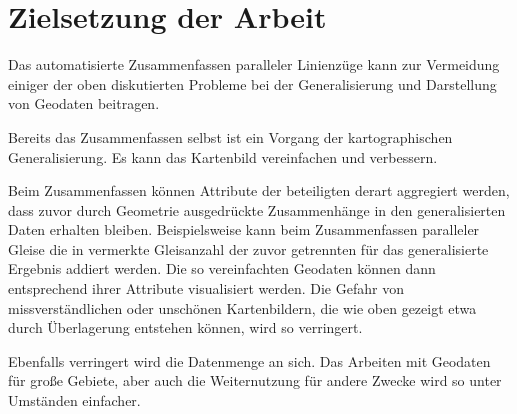 \documentclass[../main/thesis.tex]{subfiles}
\begin{document}







\section{Zielsetzung der Arbeit}


Das automatisierte Zusammenfassen paralleler Linienzüge kann zur Vermeidung einiger der oben diskutierten Probleme bei der Generalisierung und Darstellung von Geodaten beitragen.

Bereits das Zusammenfassen selbst ist ein Vorgang der kartographischen Generalisierung.
Es kann das Kartenbild vereinfachen und verbessern.

Beim Zusammenfassen können Attribute der beteiligten  derart aggregiert werden, dass zuvor durch Geometrie ausgedrückte Zusammenhänge in den generalisierten Daten erhalten bleiben.
Beispielsweise kann beim Zusammenfassen paralleler Gleise die in  vermerkte Gleisanzahl der zuvor getrennten  für das generalisierte Ergebnis addiert werden.
Die so vereinfachten Geodaten können dann entsprechend ihrer Attribute visualisiert werden.
Die Gefahr von missverständlichen oder unschönen Kartenbildern, die wie oben gezeigt etwa durch Überlagerung entstehen können, wird so verringert.

Ebenfalls verringert wird die Datenmenge an sich.
Das Arbeiten mit Geodaten für große Gebiete, aber auch die Weiternutzung für andere Zwecke wird so unter Umständen einfacher.
\end{document}
